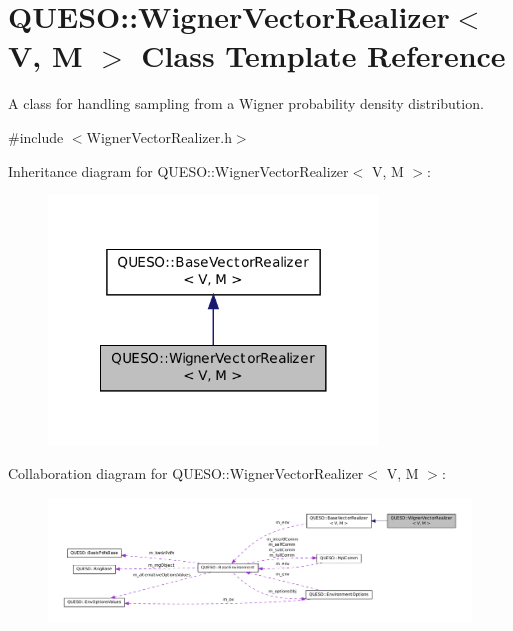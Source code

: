 \hypertarget{class_q_u_e_s_o_1_1_wigner_vector_realizer}{\section{Q\-U\-E\-S\-O\-:\-:Wigner\-Vector\-Realizer$<$ V, M $>$ Class Template Reference}
\label{class_q_u_e_s_o_1_1_wigner_vector_realizer}
}


A class for handling sampling from a Wigner probability density distribution.  




{\ttfamily \#include $<$Wigner\-Vector\-Realizer.\-h$>$}



Inheritance diagram for Q\-U\-E\-S\-O\-:\-:Wigner\-Vector\-Realizer$<$ V, M $>$\-:
\nopagebreak
\begin{figure}[H]
\begin{center}
\leavevmode
\includegraphics[width=248pt]{class_q_u_e_s_o_1_1_wigner_vector_realizer__inherit__graph}
\end{center}
\end{figure}


Collaboration diagram for Q\-U\-E\-S\-O\-:\-:Wigner\-Vector\-Realizer$<$ V, M $>$\-:
\nopagebreak
\begin{figure}[H]
\begin{center}
\leavevmode
\includegraphics[width=350pt]{class_q_u_e_s_o_1_1_wigner_vector_realizer__coll__graph}
\end{center}
\end{figure}
